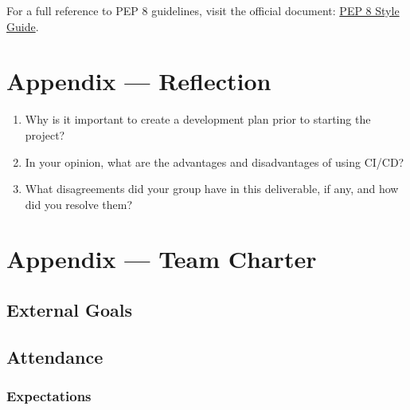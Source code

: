 \documentclass{article}
\begin{document}
For a full reference to PEP 8 guidelines, visit the official document: \href{https://peps.python.org/pep-0008/}{PEP 8 Style Guide}.


\newpage{}

\section*{Appendix --- Reflection}




\begin{enumerate}
    \item Why is it important to create a development plan prior to starting the
    project?
    \item In your opinion, what are the advantages and disadvantages of using
    CI/CD?
    \item What disagreements did your group have in this deliverable, if any,
    and how did you resolve them?
\end{enumerate}

\newpage{}

\section*{Appendix --- Team Charter}


\subsection*{External Goals}


\subsection*{Attendance}

\subsubsection*{Expectations}
\end{document}
